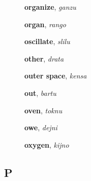\documentclass[12pt]{book}
\begin{document}
\begin{description}
\item[ ] \textbf{organize}, \textit{ganzu}

\item[ ] \textbf{organ}, \textit{rango}

\item[ ] \textbf{oscillate}, \textit{slilu}

\item[ ] \textbf{other}, \textit{drata}

\item[ ] \textbf{outer space}, \textit{kensa}

\item[ ] \textbf{out}, \textit{bartu}

\item[ ] \textbf{oven}, \textit{toknu}

\item[ ] \textbf{owe}, \textit{dejni}

\item[ ] \textbf{oxygen}, \textit{kijno}

\end{description}



\subsection{P} %
\end{document}
